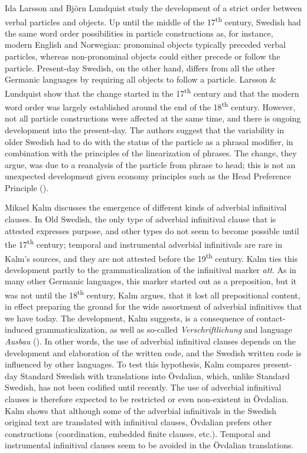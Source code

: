 \documentclass[output=paper]{langscibook}
\begin{document}
Ida Larsson and Björn Lundquist study the development of a strict order between verbal particles and objects. Up until the middle of the 17\textsuperscript{th} century, Swedish had the same word order possibilities in particle constructions as, for instance, modern English and Norwegian: pronominal objects typically preceded verbal particles, whereas non-pronominal objects could either precede or follow the particle. Present-day Swedish, on the other hand, differs from all the other Germanic languages by requiring all objects to follow a particle. Larsson \& Lundquist show that the change started in the 17\textsuperscript{th} century and that the modern word order was largely established around the end of the 18\textsuperscript{th} century. However, not all particle constructions were affected at the same time, and there is ongoing development into the present-day. The authors suggest that the variability in older Swedish had to do with the status of the particle as a phrasal modifier, in combination with the principles of the linearization of phrases. The change, they argue, was due to a reanalysis of the particle from phrase to head; this is not an unexpected development given economy principles such as the Head Preference Principle (\citealt{van_Gelderen2004}).



Mikael Kalm discusses the emergence of different kinds of adverbial infinitival clauses. In Old Swedish, the only type of adverbial infinitival clause that is attested expresses purpose, and other types do not seem to become possible until the 17\textsuperscript{th} century; temporal and instrumental adverbial infinitivals are rare in Kalm’s sources, and they are not attested before the 19\textsuperscript{th} century. Kalm ties this development partly to the grammaticalization of the infinitival marker \textit{att}. As in many other Germanic languages, this marker started out as a preposition, but it was not until the 18\textsuperscript{th} century, Kalm argues, that it lost all prepositional content, in effect preparing the ground for the wide assortment of adverbial infinitives that we have today. The development, Kalm suggests, is a consequence of contact-induced grammaticalization, as well as so-called \textit{Verschriftlichung} and language \textit{Ausbau} (\citealt{Hoder2009, Hoder2010, Hoder2009}). In other words, the use of adverbial infinitival clauses depends on the development and elaboration of the written code, and the Swedish written code is influenced by other languages. To test this hypothesis, Kalm compares present-day Standard Swedish with translations into Övdalian, which, unlike Standard Swedish, has not been codified until recently. The use of adverbial infinitival clauses is therefore expected to be restricted or even non-existent in Övdalian. Kalm shows that although some of the adverbial infinitivals in the Swedish original text are translated with infinitival clauses, Övdalian prefers other constructions (coordination, embedded finite clauses, etc.). Temporal and instrumental infinitival clauses seem to be avoided in the Övdalian translations.
\end{document}
